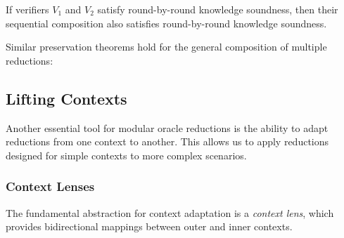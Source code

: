 \begin{theorem}
    \label{thm:rbr_knowledge_soundness_append}
    If verifiers $V_1$ and $V_2$ satisfy round-by-round knowledge soundness, then their sequential composition also satisfies round-by-round knowledge soundness.
\end{theorem}

Similar preservation theorems hold for the general composition of multiple reductions:

\begin{theorem}
    \label{thm:completeness_compose}
\end{theorem}

\begin{theorem}
    \label{thm:soundness_compose}
\end{theorem}

\begin{theorem}
    \label{thm:knowledge_soundness_compose}
\end{theorem}

\subsection{Lifting Contexts}\label{sec:lifting_contexts}

Another essential tool for modular oracle reductions is the ability to adapt reductions from one context to another. This allows us to apply reductions designed for simple contexts to more complex scenarios.

\subsubsection{Context Lenses}

The fundamental abstraction for context adaptation is a \emph{context lens}, which provides bidirectional mappings between outer and inner contexts.

